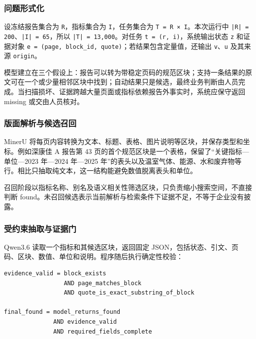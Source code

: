 \documentclass[UTF8,a4paper,11pt]{ctexart}
\begin{document}
\subsubsection{问题形式化}

设冻结报告集合为 \texttt{R}，指标集合为 \texttt{I}，任务集合为 \texttt{T = R × I}。本次运行中 \texttt{|R| = 200}、\texttt{|I| = 65}，所以 \texttt{|T| = 13,000}。对任务 \texttt{t = (r, i)}，系统输出状态 \texttt{z} 和证据对象 \texttt{e = (page, block\_id, quote)}；若结果包含定量值，还输出 \texttt{v}、\texttt{u} 及其来源 \texttt{origin}。\par

模型建立在三个假设上：报告可以转为带稳定页码的规范区块；支持一条结果的原文可在一个或少量相邻区块中找到；自动结果只是候选，最终业务判断由人员完成。当扫描损坏、证据跨越大量页面或指标依赖报告外事实时，系统应保守返回 missing 或交由人员核对。\par

\subsubsection{版面解析与候选召回}

MinerU 将每页内容转换为文本、标题、表格、图片说明等区块，并保存类型和坐标。例如深康佳 A 报告第 43 页的首个规范区块是一个表格，保留了“关键指标—单位—2023 年—2024 年—2025 年”的表头以及温室气体、能源、水和废弃物等行。相比只抽取纯文本，这一结构能避免数值脱离表头和单位。\par

召回阶段以指标名称、别名及语义相关性筛选区块，只负责缩小搜索空间，不直接判断 found。未召回候选表示当前解析与检索条件下证据不足，不等于企业没有披露。\par

\subsubsection{受约束抽取与证据门}

Qwen3.6 读取一个指标和其候选区块，返回固定 JSON，包括状态、引文、页码、区块、数值、单位和说明。程序随后执行确定性校验：\par

\begin{verbatim}
evidence_valid = block_exists
                 AND page_matches_block
                 AND quote_is_exact_substring_of_block

final_found = model_returns_found
              AND evidence_valid
              AND required_fields_complete
\end{verbatim}
\end{document}

